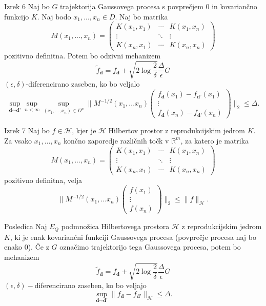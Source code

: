 \documentclass{beamer}
\begin{document}
\begin{frame}
\begin{block}{Izrek 6}
Naj bo $G$ trajektorija Gaussovega procesa s povprečjem 0 in kovariančno funkcijo $K$. Naj bodo $x_1,...,x_n \in D$. Naj bo matrika
$$
M(x_1,...,x_n) = 
 \begin{pmatrix}
  K(x_1,x_1) & \cdots & K(x_1,x_n) \\
  \vdots    & \ddots & \vdots  \\
  K(x_n,x_1) & \cdots & K(x_n,x_n) 
 \end{pmatrix}
$$
pozitivno definitna. Potem bo odzivni mehanizem 
$$
\widetilde{f}_{\textbf{d}} = f_{\textbf{d}} + \sqrt{2\log{\frac{2}{\delta}}} \frac{\Delta}{\epsilon}G
$$
$(\epsilon, \delta)$-diferencirano zaseben, ko bo veljalo
\begin{equation}\label{meja*}
\sup_{\textbf{d} \sim \textbf{d'}} \sup_{n < \infty} \sup_{(x_1,...,x_n) \in D^n} 
\bigg\|M^{-1/2}(x_1,...x_n)
\begin{pmatrix}
  f_{\textbf{d}}(x_1)-f_{\textbf{d'}}(x_1)  \\
  \vdots     \\
  f_{\textbf{d}}(x_n)-f_{\textbf{d'}}(x_n)
 \end{pmatrix}
\bigg\|_2 \leq \Delta. 
\end{equation}
\end{block}
\end{frame}

\begin{frame}
\begin{block}{Izrek 7}
Naj bo $f \in \mathcal{H}$, kjer je $\mathcal{H}$ Hilbertov prostor z reprodukcijskim jedrom $K$. Za vsako $x_1, ..., x_n$ končno zaporedje različnih točk v $\mathbb{R}^m$, za katero je matrika
$$
M(x_1,...,x_n) = 
 \begin{pmatrix}
  K(x_1,x_1) & \cdots & K(x_1,x_n) \\
  \vdots    & \ddots & \vdots  \\
  K(x_n,x_1) & \cdots & K(x_n,x_n) 
 \end{pmatrix}
$$
pozitivno definitna, velja
$$
\bigg\|M^{-1/2}(x_1,...x_n)
\begin{pmatrix}
  f(x_1)  \\
  \vdots     \\
  f(x_n)
 \end{pmatrix}
\bigg\|_2 \leq \|f\|_{\mathcal{H}}.
$$
\end{block}
\end{frame}

\begin{frame}
\begin{block}{Posledica}
Naj $E_Q$  podmnožica Hilbertovega prostora $\mathcal{H}$ z reprodukcijskim jedrom $K$, ki je enak kovariančni funkciji Gaussovega procesa (povprečje procesa naj bo enako 0). Če z $G$ označimo trajektorijo tega Gaussovega procesa, potem bo mehanizem 
$$
\widetilde{f}_{\textbf{d}} = f_{\textbf{d}} + \sqrt{2\log{\frac{2}{\delta}}} \frac{\Delta}{\epsilon}G
$$
$(\epsilon,\delta)-$diferencirano zaseben, ko bo veljajo 
$$
\sup_{\textbf{d} \sim \textbf{d'}} \| f_{\textbf{d}} -  f_{\textbf{d'}} \|_{\mathcal{H}} \leq \Delta.
$$
\end{block}
\end{frame}
\end{document}
